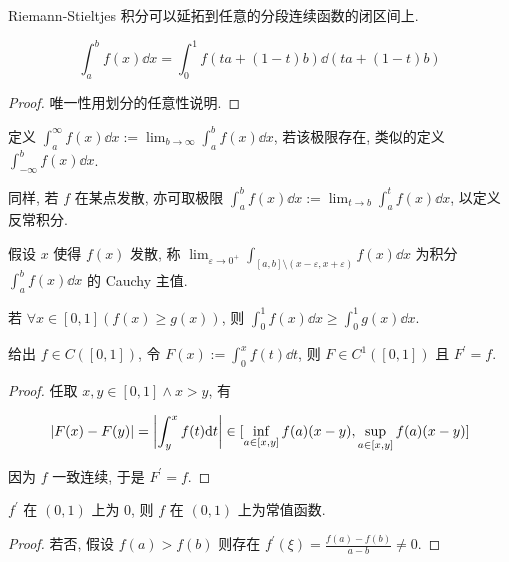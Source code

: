 \begin{remark}
    Riemann-Stieltjes 积分可以延拓到任意的分段连续函数的闭区间上.

    \[
        \int_{a}^{b} f(x) \dd x = \int_{0}^{1} f(ta + (1-t)b) \dd (ta + (1-t)b)
    \]

    \begin{proof}
        唯一性用划分的任意性说明.
    \end{proof}
\end{remark}

\begin{definition}[反常积分]
    定义 \(\int_{a}^{\infty} f(x) \dd x := \lim_{b \to \infty} \int_{a}^{b} f(x) \dd x\), 若该极限存在,
    类似的定义 \(\int_{-\infty}^{b} f(x) \dd x\).

    同样, 若 \(f\) 在某点发散, 亦可取极限 \(\int_{a}^{b} f(x) \dd x := \lim_{t \to b} \int_{a}^{t} f(x) \dd x\), 
    以定义反常积分.
\end{definition}

\begin{definition}
    假设 \(x\)  使得 \(f(x)\) 发散, 称 \(\lim_{\varepsilon \to 0^{+}} \int_{[a,b] \setminus (x-\varepsilon,x+\varepsilon)} f(x) \dd x\) 为积分 \(\int_{a}^{b} f(x) \dd x\) 的 Cauchy 主值.
\end{definition}

\begin{lemma}
    若 \(\forall x \in [0,1] (f(x) \geq g(x))\), 则 \(\int_{0}^{1} f(x) \dd x \geq \int_{0}^{1} g(x) \dd x\).
\end{lemma}

\begin{theorem}[微积分基本定理]
    给出 \(f \in C([0,1])\), 令 \(F(x) := \int_{0}^{x} f(t) \dd t\), 则 \(F \in C^1([0,1])\) 且 \(F^\prime = f\).

    \begin{proof}
        任取 \(x,y \in [0,1] \land x > y\), 有

        \[
            \abs {F(x) - F(y)} = \abs {\int_{y}^{x} f(t) \dd t} \in [\inf_{a \in [x,y]} f(a) (x-y),\sup_{a \in [x,y]} f(a) (x-y)]
        \]

        因为 \(f\) 一致连续, 于是 \(F^\prime = f\).
    \end{proof}
\end{theorem}

\begin{theorem}[常微分方程基本定理]
    \(f^\prime\) 在 \((0,1)\) 上为 \(0\), 则 \(f\) 在 \((0,1)\) 上为常值函数.

    \begin{proof}
        若否, 假设 \(f(a) > f(b)\) 则存在 \(f^\prime (\xi) = \frac{f(a)-f(b)}{a-b} \neq 0\).
    \end{proof}
\end{theorem}

